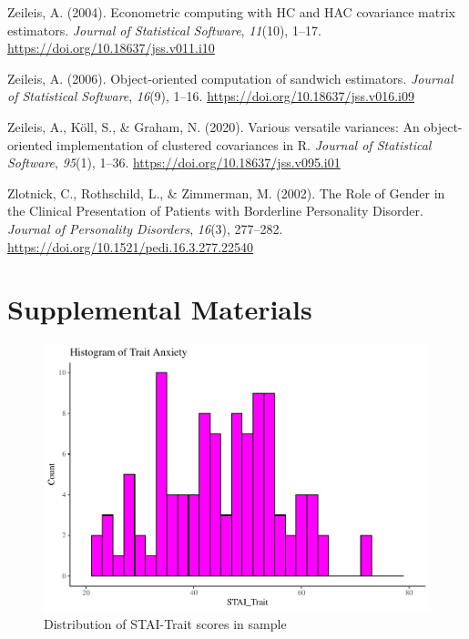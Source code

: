 \documentclass[
  man,floatsintext]{apa7}
\newlength{\cslhangindent}
\newlength{\cslentryspacingunit} %
\newenvironment{CSLReferences}[2] %
 {%
  \setlength{\parindent}{0pt}
  \ifodd #1
  \let\oldpar\par
  \def\par{\hangindent=\cslhangindent\oldpar}
  \fi
  \setlength{\parskip}{#2\cslentryspacingunit}
 }%
 {}
\begin{document}
\begin{CSLReferences}{1}{0}
\leavevmode{}%
Zeileis, A. (2004). Econometric computing with {HC} and {HAC} covariance matrix estimators. \emph{Journal of Statistical Software}, \emph{11}(10), 1--17. \url{https://doi.org/10.18637/jss.v011.i10}

\leavevmode{}%
Zeileis, A. (2006). Object-oriented computation of sandwich estimators. \emph{Journal of Statistical Software}, \emph{16}(9), 1--16. \url{https://doi.org/10.18637/jss.v016.i09}

\leavevmode{}%
Zeileis, A., Köll, S., \& Graham, N. (2020). Various versatile variances: An object-oriented implementation of clustered covariances in {R}. \emph{Journal of Statistical Software}, \emph{95}(1), 1--36. \url{https://doi.org/10.18637/jss.v095.i01}

\leavevmode{}%
Zlotnick, C., Rothschild, L., \& Zimmerman, M. (2002). The {Role} of {Gender} in the {Clinical Presentation} of {Patients} with {Borderline Personality Disorder}. \emph{Journal of Personality Disorders}, \emph{16}(3), 277--282. \url{https://doi.org/10.1521/pedi.16.3.277.22540}

\end{CSLReferences}

\newpage

\hypertarget{Supplemental-Materials}{%
\section{Supplemental Materials}\label{Supplemental-Materials}}

\begin{figure}[H]
\includegraphics[width=0.7\linewidth]{d2m-Psychopathy_files/figure-latex/STAI-descriptives-1} \caption{Distribution of STAI-Trait scores in sample}\label{fig:STAI-descriptives-appendix}
\end{figure}
\end{document}
